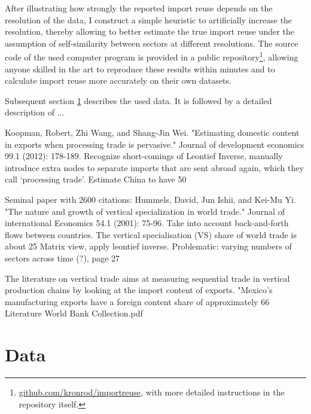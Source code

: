 \documentclass{paper}
\begin{document}
After illustrating how strongly the reported import reuse depends on the resolution of the data, I construct a simple heuristic to artificially increase the resolution, thereby allowing to better estimate the true import reuse under the assumption of self-similarity between sectors at different resolutions. The source code of the used computer program is provided in a public repository\footnote{\href{https://github.com/kronrod/importreuse}{github.com/kronrod/importreuse}, with more detailed instructions in the repository itself.}, allowing anyone skilled in the art to reproduce these results within minutes and to calculate import reuse more accurately on their own datasets.

Subsequent section \ref{sec:data} describes the used data. It is followed by a detailed description of ...


Koopman, Robert, Zhi Wang, and Shang-Jin Wei. "Estimating domestic content in exports when processing trade is pervasive." Journal of development economics 99.1 (2012): 178-189.
Recognize short-comings of Leontief Inverse, manually introduce extra nodes to separate imports that are sent abroad again, which they call ‘processing trade’. Estimate China to have 50%

Seminal paper with 2600 citations:
Hummels, David, Jun Ishii, and Kei-Mu Yi. "The nature and growth of vertical specialization in world trade." Journal of international Economics 54.1 (2001): 75-96.
Take into account back-and-forth flows between countries. The vertical specialisation (VS) share of world trade is about 25%
Matrix view, apply leontief inverse.
Problematic: varying numbers of sectors across time (?), page 27


The literature on vertical trade aims at measuring sequential trade in vertical production chains by looking at the import content of exports.
"Mexico’s manufacturing exports have a foreign content share of approximately 66%
Literature World Bank Collection.pdf

\section{Data}
\label{sec:data}
\end{document}
